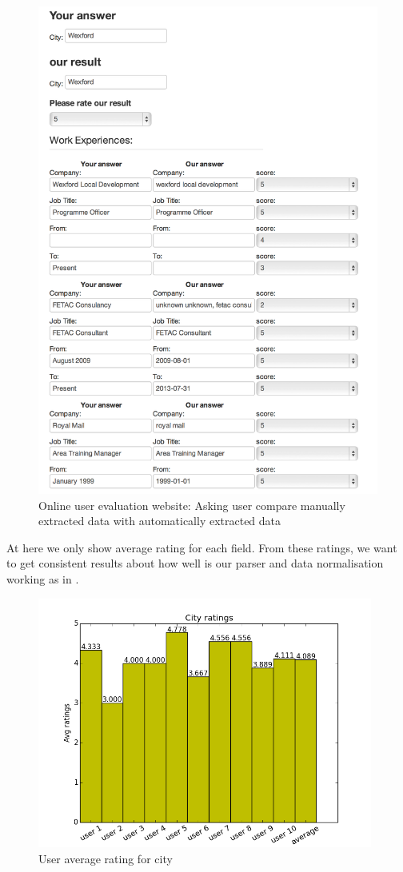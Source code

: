 \begin{figure}[H]
	\centering
	\includegraphics[scale=0.8]{images/user-compare.png}
	\caption{Online user evaluation website: Asking user compare manually extracted data with automatically extracted data\protect}
	\label{fig:UserCompare}
\end{figure}

At here we only show average rating for each field. From these ratings, we want to get consistent results about how well is our parser and data normalisation working as in . 

\begin{figure}[H]
\centering
\includegraphics[width=110mm]{images/evaluation/average_city_score.png}
\caption{User average rating for city}
\label{fig:city}
\end{figure}

